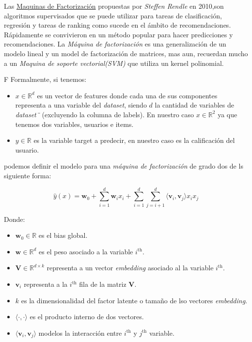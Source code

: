 \documentclass[11pt,a4paper,twoside]{thesis}
\begin{document}
Las \href{https://www.csie.ntu.edu.tw/~b97053/paper/Rendle2010FM.pdf}{Maquinas de Factorización} propuestas por \textit{Steffen Rendle} en 2010,son algoritmos supervisados que se puede utilizar para tareas de clasificación, regresión y tareas de ranking como sucede en el ámbito de recomendaciones. Rápidamente se convivieron en un método popular para hacer predicciones y recomendaciones. La \textit{Máquina de factorización} es una generalización de un modelo lineal y un model de factorización de matrices, mas aun, recuerdan mucho a un \textit{Maquina de soporte vectorial(SVM)} que utiliza un kernel polinomial.

F
Formalmente, si tenemos:

\begin{itemize}
	\item $x\in\mathbb{R}^{d}$ es un vector de features donde cada una de sus componentes representa a una variable del \textit{dataset}, siendo $d$ la cantidad de variables de \textit{dataset¨} (excluyendo la columna de labels). En nuestro caso $x\in\mathbb{R}^{2}$ ya que tenemos dos variables, usuarios e items.
	\item $y\in\mathbb{R}$ es la variable target a predecir, en nuestro caso es la calificación del usuario. 
\end{itemize}

podemos definir el modelo para una \textit{máquina de factorización} de grado dos de ls siguiente forma:

\begin{equation*}
\hat{y}(x) = \mathbf{w}_0 + \sum_{i=1}^d \mathbf{w}_i x_i + \sum_{i=1}^d\sum_{j=i+1}^d \langle\mathbf{v}_i, \mathbf{v}_j\rangle x_i x_j
\end{equation*}
\begin{description}
	\item[Donde:]
\end{description}
\begin{itemize}
	\item $\mathbf{w}_0 \in \mathbb{R}$ es el bias global.
	\item $\mathbf{w} \in \mathbb{R}^d$ es el peso asociado a la variable $i^\mathrm{th}$.
	\item $\mathbf{V} \in \mathbb{R}^{d\times k}$ representa a un vector \textit{embedding} asociado al la variable $i^\mathrm{th}$.
	\item $\mathbf{v}_i$ representa a la $i^\mathrm{th}$ fila de la matriz $\mathbf{V}$. 
	\item $k$ es la dimensionalidad del factor latente o tamaño de lso vectores \textit{embedding}.
	\item $\langle\cdot, \cdot \rangle$ es el producto interno de dos vectores.
	\item $\langle \mathbf{v}_i, \mathbf{v}_j \rangle$ modelos la interacción entre $i^\mathrm{th}$ y $j^\mathrm{th}$ variable. 
\end{itemize}
\end{document}
